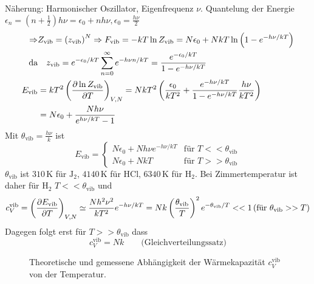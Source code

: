 \begin{enumerate}[A)]
    Näherung: Harmonischer Oszillator, Eigenfrequenz $\nu$. Quantelung der Energie
    $\epsilon_n = \left( n + \frac{1}{2} \right) h \nu = \epsilon_0 + n h \nu, \epsilon_0 = \frac{h \nu}{2}$
    \begin{equation}
        \begin{split}
            \Rightarrow & Z_\text{vib} = \left( z_\text{vib} \right)^N \Rightarrow F_\text{vib} = - k T \ln Z_\text{vib} = N \epsilon_0 + N k T \ln \left( 1 - e^{- h \nu / kT} \right)  \\
            \text{da} &\quad  z_\text{vib} = e^{-\epsilon_0/kT} \sum_{n=0}^{\infty} e^{-h\nu n/kT} = \frac{e^{-\epsilon_0 / kT}}{1 - e^{- h \nu / kT}} \\
            E_\text{vib} &= k T^2 \left( \frac{\partial \ln Z_\text{vib}}{\partial T} \right)_{V, N} = N k T^2 \left( \frac{\epsilon_0}{k T^2} + \frac{e^{-h \nu / k T}}{1 - e^{- h \nu / kT}} \frac{h \nu}{k T^2} \right) \\
            &= N \epsilon_0 + \frac{N h \nu}{e^{h \nu / k T} - 1}
        \end{split}
    \end{equation}
    Mit $\theta_\text{vib} = \frac{h \nu}{k}$ ist
    \begin{equation}
        E_\text{vib} =
        \begin{cases}
            N \epsilon_0 + N h \nu e^{- h \nu / kT} & \text{für } T << \theta_\text{vib} \\
            N \epsilon_0 + N k T & \text{für } T >> \theta_\text{vib}
        \end{cases}
    \end{equation}
    $\theta_\text{vib}$ ist $310\,$K für $\text{J}_2$, $4140\,$K für HCl, $6340\,$K für H$_2$. Bei Zimmertemperatur ist daher für H$_2$ $T<<\theta_\text{vib}$ und
    \begin{equation}
        c_V^\text{vib} = \left( \frac{\partial E_\text{vib}}{\partial T} \right)_{V, N} \simeq \frac{N h^2 \nu^2}{k T^2} e^{- h \nu / k T} = N k \left( \frac{\theta_\text{vib}}{T} \right)^2 e^{- \theta_\text{vib} / T} << 1  \left( \text{für } \theta_\text{vib} >> T \right)
    \end{equation}
    Dagegen folgt erst für $T >> \theta_\text{vib}$ dass
    \begin{equation}
        c_V^\text{vib} = N k \qquad \text{(Gleichverteilungssatz)}
    \end{equation}
    
    \begin{figure}[H]
        \centering
        \def\svgwidth{0.5\textwidth}
        
        \caption{Theoretische und gemessene Abhängigkeit der Wärmekapazität $c_V^\text{vib}$
        von der Temperatur.}
        \label{img:CvvibTDiagram}
    \end{figure}
    

\end{enumerate}
